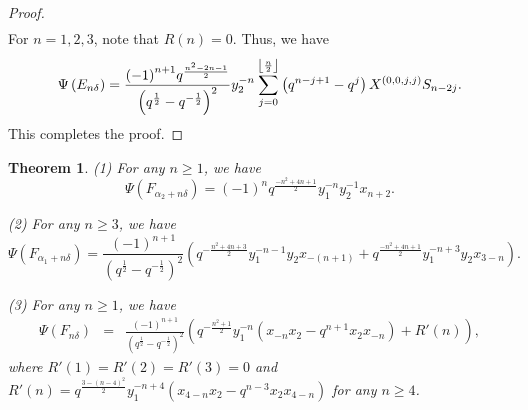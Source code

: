 \documentclass[reqno,11pt]{amsart}
\numberwithin{equation}{section}
\newtheorem{theorem}{Theorem}[section]
\begin{document}
\begin{proof}
\begin{eqnarray*}
\end{eqnarray*}\endgroup
	For $n=1,2,3$, note that $R(n)=0$. Thus, we have
	\[\Psi \left( {{E_{n\delta }}} \right) = {\rm{ }}\frac{{{{( - 1)}^{n + 1}}{q^{\frac{{{n^2} - 2n - 1}}{2}}}}}{{{{\left( {{q^{\frac{1}{2}}} - {q^{ - \frac{1}{2}}}} \right)}^2}}}y_2^{ - n}\sum\limits_{j = 0}^{\left\lfloor {\frac{n}{2}} \right\rfloor } {\left( {{q^{n - j + 1}} - {q^j}} \right){X^{(0,0,j,j)}}{S_{n - 2j}}} .\]
	This completes the proof.
\end{proof}

\begin{theorem}\label{5.6}
 (1) For any $n \ge 1$, we have
\begin{equation}\label{(F'a2+nd)}
	\Psi\left(F_{\alpha_2+n \delta}\right)=(-1)^n q^{\frac{-n^2+4 n+1}{2}} y_1^{-n} y_2^{-1} x_{n+2} .
\end{equation}

(2) For any $n \ge 3$, we have
\begin{equation}\label{(F'a1+nd)}
	\Psi\left(F_{\alpha_1+n \delta}\right)=\frac{(-1)^{n+1}}{\left(q^{\frac{1}{2}}-q^{-\frac{1}{2}}\right)^2}\left(q^{-\frac{n^2+4 n+3}{2}} y_1^{-n-1} y_2 x_{-(n+1)}+q^{\frac{-n^2+4 n+1}{2}} y_1^{-n+3} y_2 x_{3-n}\right) .
\end{equation}


(3) For any $n \ge 1$, we have
\begin{eqnarray}\label{(F'nd)}
	\Psi\left(F_{n \delta}\right)&= & \frac{(-1)^{n+1}}{\left(q^{\frac{1}{2}}-q^{-\frac{1}{2}}\right)^2}\left(q^{-\frac{n^2+1}{2}} y_1^{-n}\left(x_{-n} x_2-q^{n+1} x_2 x_{-n}\right)+R'(n)\right),
\end{eqnarray}	
where $R'(1)=R'(2)=R'(3)=0$ and $R'(n)=q^{\frac{3-(n-4)^2}{2}} y_1^{-n+4}\left(x_{4-n} x_2-q^{n-3} x_2 x_{4-n}\right)$ for any $n\ge 4$.
\end{theorem}
\end{document}
